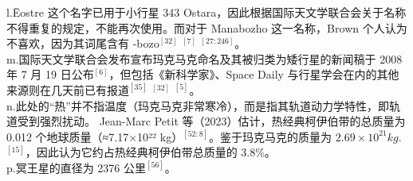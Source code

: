l.Ēostre 这个名字已用于小行星 343 Ostara，因此根据国际天文学联合会关于名称不得重复的规定，不能再次使用。而对于 Manabozho 这一名称，Brown 个人认为不喜欢，因为其词尾含有 -bozo$^{[32]}$ $^{[7]}$ $^{[27:246]}$。\\
m.国际天文学联合会发布宣布玛克马克命名及其被归类为矮行星的新闻稿于 2008 年 7 月 19 日公布$^{[6]}$，但包括《新科学家》、Space Daily 与行星学会在内的其他来源则在几天前已有报道$^{[35]}$ $^{[32]}$ $^{[5]}$。\\
n.此处的“热”并不指温度（玛克马克非常寒冷），而是指其轨道动力学特性，即轨道受到强烈扰动。
Jean-Marc Petit 等（2023）估计，热经典柯伊伯带的总质量为 0.012 个地球质量（≈7.17×10²² kg）$^{[52:8]}$。鉴于玛克马克的质量为 $2.69\times 10^{21}kg$.$^{[15]}$，因此认为它约占热经典柯伊伯带总质量的 3.8\%。\\
p.冥王星的直径为 2376 公里$^{[56]}$。
